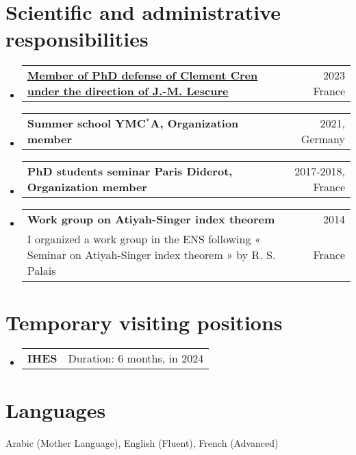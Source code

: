 \documentclass[A4,11pt]{article}
\makeatletter
\newcommand{\CVSubheading}[4]{
  \vspace{-2pt}\item
    \begin{tabular*}{0.97\textwidth}[t]{l@{\extracolsep{\fill}}r}
      \textbf{#1} & #2 \\
      \small#3 & \small #4 \\
    \end{tabular*}\vspace{-7pt}
}
\newcommand{\CVSubheadingshort}[2]{
  \vspace{-2pt}\item
    \begin{tabular*}{0.97\textwidth}[t]{l@{\extracolsep{\fill}}r}
      \textbf{#1} & #2 \\
    \end{tabular*}\vspace{-7pt}
}
\newcommand{\CVSubHeadingListStart}{\begin{itemize}[leftmargin=0.5cm, label={}]}
\newcommand{\CVSubHeadingListEnd}{\end{itemize}}
\makeatother
\begin{document}
\section{Scientific and administrative responsibilities}
 \CVSubHeadingListStart
 \CVSubheadingshort
      {\href{https://theses.fr/s279397}{\underline{Member of PhD defense of Clement Cren under the direction of J.-M. Lescure}}}{2023 France}
  \CVSubheadingshort
      {Summer school YMC$^*$A, Organization member}{2021, Germany}
      \CVSubheadingshort
      {PhD students seminar Paris Diderot, Organization member}{2017-2018, France}
          \CVSubheading
      {Work group on Atiyah-Singer index theorem}{2014}
      {I organized a work group in the ENS following « Seminar on Atiyah-Singer index theorem » by R. S. Palais}{France}
   \CVSubHeadingListEnd
\section{Temporary visiting positions}
   \CVSubHeadingListStart
   \CVSubheadingshort
        {IHES}{Duration: 6 months, in 2024}
     \CVSubHeadingListEnd


\section{Languages}
 \begin{itemize}[leftmargin=0.5cm, label={}]
    \small{\item{Arabic (Mother Language), English (Fluent), French (Advanced)}\let\thefootnote\relax{}}
 \end{itemize}
\end{document}
